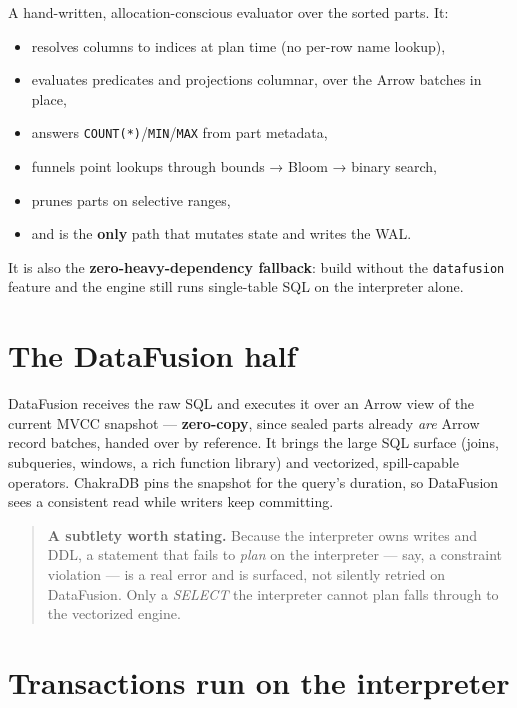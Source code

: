 \documentclass[
  11pt,
  openany]{book}
\providecommand{\tightlist}{%
  \setlength{\itemsep}{0pt}\setlength{\parskip}{0pt}}
\begin{document}
A hand-written, allocation-conscious evaluator over the sorted parts.
It:

\begin{itemize}
\tightlist
\item
  resolves columns to indices at plan time (no per-row name lookup),
\item
  evaluates predicates and projections columnar, over the Arrow batches
  in place,
\item
  answers \texttt{COUNT(*)}/\texttt{MIN}/\texttt{MAX} from part
  metadata,
\item
  funnels point lookups through bounds → Bloom → binary search,
\item
  prunes parts on selective ranges,
\item
  and is the \textbf{only} path that mutates state and writes the WAL.
\end{itemize}

It is also the \textbf{zero-heavy-dependency fallback}: build without
the \texttt{datafusion} feature and the engine still runs single-table
SQL on the interpreter alone.

\section{The DataFusion half}\label{the-datafusion-half}

DataFusion receives the raw SQL and executes it over an Arrow view of
the current MVCC snapshot --- \textbf{zero-copy}, since sealed parts
already \emph{are} Arrow record batches, handed over by reference. It
brings the large SQL surface (joins, subqueries, windows, a rich
function library) and vectorized, spill-capable operators. ChakraDB pins
the snapshot for the query's duration, so DataFusion sees a consistent
read while writers keep committing.

\begin{quote}
\textbf{A subtlety worth stating.} Because the interpreter owns writes
and DDL, a statement that fails to \emph{plan} on the interpreter ---
say, a constraint violation --- is a real error and is surfaced, not
silently retried on DataFusion. Only a \emph{SELECT} the interpreter
cannot plan falls through to the vectorized engine.
\end{quote}

\section{Transactions run on the
interpreter}\label{transactions-run-on-the-interpreter}
\end{document}
